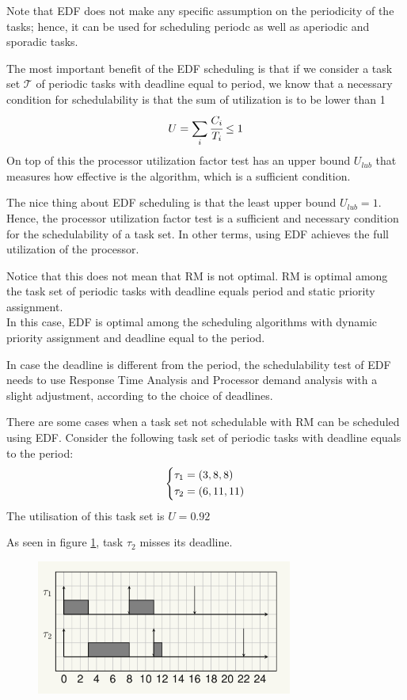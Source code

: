 Note that EDF does not make any specific assumption on the periodicity of the tasks; hence, it can be used for scheduling periodc as well as aperiodic and sporadic tasks.

The most important benefit of the EDF scheduling is that if we consider a task set $\mathcal{T}$ of periodic tasks with deadline equal to period, we know that a necessary condition for schedulability is that the sum of utilization is to be lower than 1
\[U = \sum_i\cfrac{C_i}{T_i} \le 1\]
On top of this the processor utilization factor test has an upper bound $U_{lub}$ that measures how effective is the algorithm, which is a sufficient condition.

The nice thing about EDF scheduling is that the least upper bound $U_{lub}=1$. Hence, the processor utilization factor test is a sufficient and necessary condition for the schedulability of a task set.
In other terms, using EDF achieves the full utilization of the processor.

Notice that this does not mean that RM is not optimal. RM is optimal among the task set of periodic tasks with deadline equals period and static priority assignment.\\
In this case, EDF is optimal among the scheduling algorithms with dynamic priority assignment and deadline equal to the period.

In case the deadline is different from the period, the schedulability test of EDF needs to use Response Time Analysis and Processor demand analysis with a slight adjustment, according to the choice of deadlines.

There are some cases when a task set not schedulable with RM can be scheduled using EDF. Consider the following task set of periodic tasks with deadline equals to the period:
\[
\begin{dcases}
    \tau_1 = (3,8,8)\\
    \tau_2 = (6,11,11)
\end{dcases}    
\]
The utilisation of this task set is $U = 0.92$

As seen in figure \ref{fig:image14}, task $\tau_2$ misses its deadline.
\begin{figure}[!h]
    \centering
    \includegraphics[width = 0.75\textwidth]{images/image14}
    \caption{}
    \label{fig:image14}
\end{figure}

